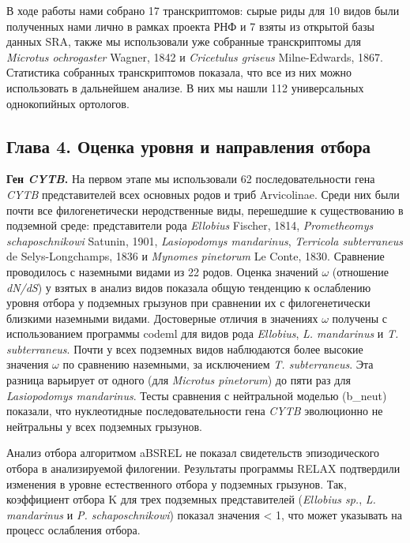 В ходе работы нами собрано 17 транскриптомов: сырые риды для 10 видов были полученных нами лично в рамках проекта РНФ и 7 взяты из открытой базы данных SRA, также мы использовали уже собранные транскриптомы для \textit{Microtus ochrogaster} Wagner, 1842 и \textit{Cricetulus griseus} Milne-Edwards, 1867. Статистика собранных транскриптомов показала, что все из них можно использовать в дальнейшем анализе. В них мы нашли 112 универсальных однокопийных ортологов. 


\subsection*{Глава 4. Оценка уровня и направления отбора}

\textbf{Ген \textit{CYTB}.} На первом этапе мы использовали 62 последовательности гена \textit{CYTB} представителей всех основных родов и триб Arvicolinae. Среди них были почти все филогенетически неродственные виды, перешедшие к существованию в подземной среде: представители рода \textit{Ellobius} Fischer, 1814, \textit{Prometheomys schaposchnikowi} Satunin, 1901, \textit{Lasiopodomys mandarinus}, \textit{Terricola subterraneus} de Selys-Longchamps, 1836 и \textit{Mynomes pinetorum} Le Conte, 1830. Сравнение проводилось с наземными видами из 22 родов.  Оценка значений $\omega$ (отношение \textit{dN/dS}) у взятых в анализ видов показала общую тенденцию к ослаблению уровня отбора у подземных грызунов при сравнении их с филогенетически близкими наземными видами. Достоверные отличия в значениях $\omega$ получены с использованием программы codeml для видов рода \textit{Ellobius}, \textit{L. mandarinus} и \textit{T. subterraneus}. Почти у всех подземных видов наблюдаются более высокие значения $\omega$ по сравнению наземными, за исключением \textit{T. subterraneus}. Эта разница варьирует от одного (для \textit{Microtus pinetorum}) до пяти раз для \textit{Lasiopodomys mandarinus}. Тесты сравнения с нейтральной моделью (b\_neut) показали, что нуклеотидные последовательности гена \textit{CYTB} эволюционно не нейтральны у всех подземных грызунов. 

Анализ отбора алгоритмом aBSREL не показал свидетельств эпизодического отбора в анализируемой филогении. Результаты программы RELAX подтвердили изменения в уровне естественного отбора у подземных грызунов. Так, коэффициент отбора K для трех подземных представителей (\textit{Ellobius sp.}, \textit{L. mandarinus} и \textit{P. schaposchnikowi}) показал значения < 1, что может указывать на процесс ослабления отбора. 

